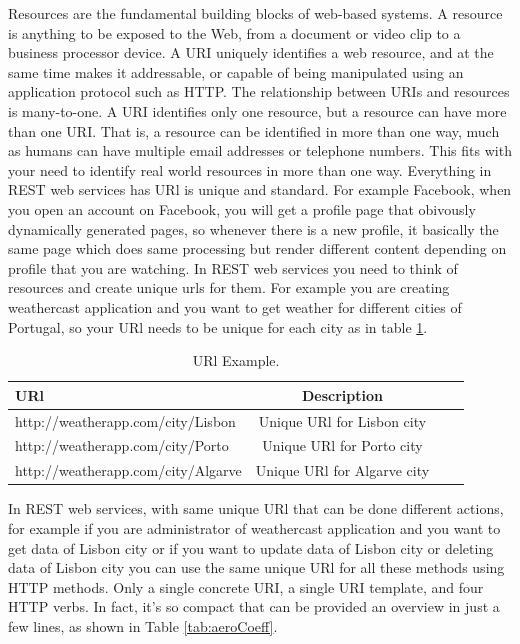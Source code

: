 Resources are the fundamental building blocks of web-based systems. A resource is anything to be exposed to the Web,
from a document or video clip to a business processor device. A URI uniquely identifies a web resource, and at the same time makes it addressable, or capable of being manipulated using an application protocol such as HTTP. The relationship between URIs and resources is many-to-one\citep{thesis:state5_2}. A URI identifies only one resource, but a resource can have more than one URI. That is, a resource can be identified in more than one way, much as humans can have multiple email addresses or telephone numbers. This fits with your need to identify real world resources in more than one way. Everything in REST web services has URl is unique and standard. For example Facebook, when you open an account on Facebook, you will get a profile page that obivously dynamically generated pages, so whenever there is a new profile, it basically the same page which does same processing but render different content depending on profile that you are watching. In REST web services you need to think of resources and create unique urls for them. For example you are creating weathercast application and you want to get weather for different cities of Portugal, so your URl needs to be unique for each city as in table \ref{tab:urlexample}.

\begin{table}[!htb]
  \renewcommand{\arraystretch}{1.2} %
  \centering
  \begin{tabular}{lccc}
    \toprule
    URl & Description  \\
    \midrule
    http://weatherapp.com/city/Lisbon &  Unique URl for Lisbon city\\
    http://weatherapp.com/city/Porto & Unique URl for Porto city\\
    http://weatherapp.com/city/Algarve & Unique URl for Algarve city\\
    \bottomrule
  \end{tabular}
  \caption[URl Example.]{URl Example.}
  \label{tab:urlexample}
\end{table}

In REST web services, with same unique URl that can be done different actions, for example if you are administrator of weathercast application and you want to get data of Lisbon city or if you want to update data of Lisbon city or deleting data of Lisbon city you can use the same unique URl for all these methods using HTTP methods. Only a single concrete URI, a single URI template, and four HTTP verbs. In fact, it’s so compact that can be provided an overview in just a few lines, as shown in Table \ref{tab:aeroCoeff}.

